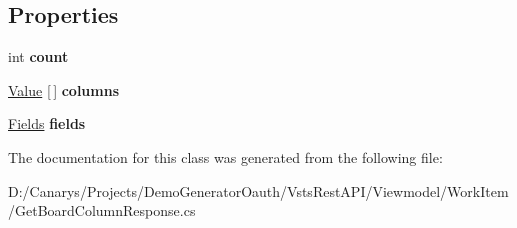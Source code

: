 \subsection*{Properties}
\begin{DoxyCompactItemize}
\item 
\mbox{\label{class_vsts_rest_a_p_i_1_1_viewmodel_1_1_work_item_1_1_get_board_column_response_1_1_column_response_a643b06eae953cc06269cc05ad678273e}} 
int {\bfseries count}
\item 
\mbox{\label{class_vsts_rest_a_p_i_1_1_viewmodel_1_1_work_item_1_1_get_board_column_response_1_1_column_response_a6d5e35ed4c85bc3071c2c010e262cc5c}} 
\mbox{\hyperlink{class_vsts_rest_a_p_i_1_1_viewmodel_1_1_work_item_1_1_get_board_column_response_1_1_value}{Value}} \mbox{[}$\,$\mbox{]} {\bfseries columns}
\item 
\mbox{\label{class_vsts_rest_a_p_i_1_1_viewmodel_1_1_work_item_1_1_get_board_column_response_1_1_column_response_a5364062711e0c5bc8e7554d60d5f048f}} 
\mbox{\hyperlink{class_vsts_rest_a_p_i_1_1_viewmodel_1_1_work_item_1_1_get_board_column_response_1_1_fields}{Fields}} {\bfseries fields}
\end{DoxyCompactItemize}


The documentation for this class was generated from the following file\+:\begin{DoxyCompactItemize}
\item 
D\+:/\+Canarys/\+Projects/\+Demo\+Generator\+Oauth/\+Vsts\+Rest\+A\+P\+I/\+Viewmodel/\+Work\+Item/Get\+Board\+Column\+Response.\+cs\end{DoxyCompactItemize}
